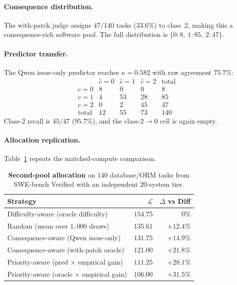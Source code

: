 \documentclass{article}
\begin{document}
\paragraph{Consequence distribution.}
The with-patch judge assigns $47/140$ tasks ($33.6\%$) to class~2,
making this a consequence-rich software pool. The full distribution is
$\{0{:}8,\ 1{:}85,\ 2{:}47\}$.

\paragraph{Predictor transfer.}
The Qwen issue-only predictor reaches $\kappa=0.582$ with raw
agreement $75.7\%$:
\[
\begin{array}{c|ccc|c}
& \hat{c}=0 & \hat{c}=1 & \hat{c}=2 & \text{total} \\\hline
c=0 & 8 & 0 & 0 & 8 \\
c=1 & 4 & 53 & 28 & 85 \\
c=2 & 0 & 2 & 45 & 47 \\\hline
\text{total} & 12 & 55 & 73 & 140
\end{array}
\]
Class-$2$ recall is $45/47$ ($95.7\%$), and the class-$2\to0$ cell is
again empty.

\paragraph{Allocation replication.}
Table~\ref{tab:seconddomain} repeats the matched-compute comparison.

\begin{table}[h]
\centering
\caption{\textbf{Second-pool allocation} on $140$ database/ORM tasks
from SWE-bench Verified with an independent $20$-system tier.}
\label{tab:seconddomain}
\small
\begin{tabular}{lrr}
\toprule
Strategy & $\mathcal{L}$ & $\Delta$ vs Diff \\
\midrule
Difficulty-aware (oracle difficulty) & $154.75$ & $0\%$ \\
Random (mean over $1{,}000$ draws) & $135.61$ & $+12.4\%$ \\
Consequence-aware (Qwen issue-only) & $131.75$ & $+14.9\%$ \\
Consequence-aware (with-patch oracle) & $121.00$ & $+21.8\%$ \\
Priority-aware (pred $\times$ empirical gain) & $111.25$ & $+28.1\%$ \\
Priority-aware (oracle $\times$ empirical gain) & $\mathbf{106.00}$ & $\mathbf{+31.5\%}$ \\
\bottomrule
\end{tabular}
\end{table}
\end{document}
